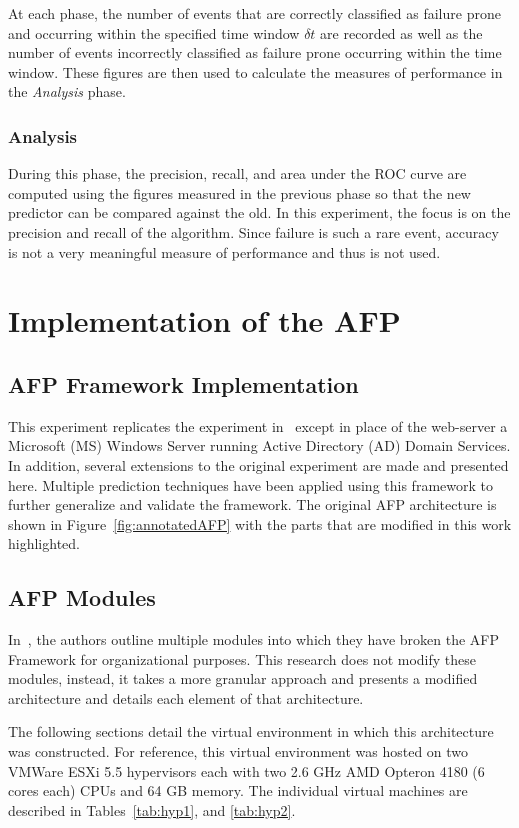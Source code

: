 At each phase, the number of events that are correctly classified as failure
prone and occurring within the specified time window $\delta t$ are recorded as
well as the number of events incorrectly classified as failure prone occurring
within the time window.  These figures are then used to calculate the measures
of performance in the \emph{Analysis} phase.

\subsubsection{Analysis}
During this phase, the precision, recall, and area under the ROC curve are
computed using the figures measured in the previous phase so that the new
predictor can be compared against the old.  In this experiment, the focus is on
the precision and recall of the algorithm.  Since failure is such a rare event,
accuracy is not a very meaningful measure of performance and thus is not used.

\section{Implementation of the AFP} \label{sec:implementation}
\subsection{AFP Framework Implementation}
This experiment replicates the experiment in~\cite{irrera2015} except in place
of the web-server a Microsoft (MS) Windows Server running Active Directory (AD)
Domain Services.  In addition, several extensions to the original experiment
are made and presented here.  Multiple prediction techniques have been applied
using this framework to further generalize and validate the framework.  The
original AFP architecture is shown in Figure~\ref{fig:annotatedAFP} with the
parts that are modified in this work highlighted.  

\subsection{AFP Modules}
In~\cite{irrera2015}, the authors outline multiple modules into which they have
broken the AFP Framework for organizational purposes.  This research does not
modify these modules, instead, it takes a more granular approach and presents a
modified architecture and details each element of that architecture.

\figannotatedAFP  

The following sections detail the virtual environment in which this
architecture was constructed.  For reference, this virtual environment was
hosted on two VMWare ESXi 5.5 hypervisors each with two 2.6 GHz AMD Opteron
4180 (6 cores each) CPUs and 64 GB memory.  The individual virtual machines are
described in Tables~\ref{tab:hyp1}, and \ref{tab:hyp2}.

